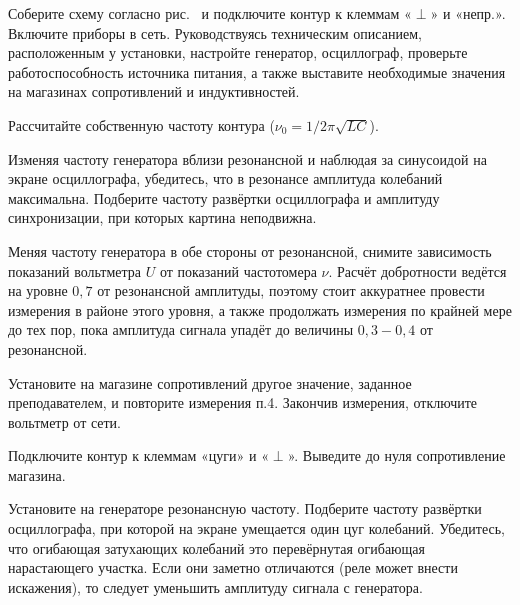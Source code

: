 \begin{lab:task}



	\item Соберите схему согласно рис.~
	и подключите контур к клеммам «$\perp$» и
«непр.». Включите приборы в сеть. Руководствуясь техническим описанием,
расположенным у установки, настройте генератор, осциллограф, проверьте
работоспособность источника питания, а также выставите необходимые
значения на магазинах сопротивлений и индуктивностей.


	\item Рассчитайте собственную частоту контура
($\nu_{0} = 1/2\pi\sqrt{LC}$).

	\item Изменяя частоту генератора вблизи резонансной и наблюдая за
синусоидой на экране осциллографа, убедитесь, что в резонансе амплитуда
колебаний максимальна. Подберите частоту развёртки осциллографа и
амплитуду синхронизации, при которых картина неподвижна.

	\item Меняя частоту генератора в обе стороны от резонансной, снимите
зависимость показаний вольтметра $U$ от показаний частотомера
$\nu$. Расчёт добротности ведётся на уровне $0,7$ от резонансной
амплитуды, поэтому стоит аккуратнее провести измерения в районе этого
уровня, а также продолжать измерения по крайней мере до тех пор, пока
амплитуда сигнала упадёт до величины $0,3 - 0,4$ от резонансной.

	\item Установите на магазине сопротивлений другое значение, заданное
преподавателем, и повторите измерения п.4. Закончив измерения, отключите
вольтметр от сети.


	\item Подключите контур к клеммам «цуги» и «$\perp$». Выведите до нуля
сопротивление магазина.

	\item Установите на генераторе резонансную частоту. Подберите частоту
развёртки осциллографа, при которой на экране умещается один цуг
колебаний. Убедитесь, что огибающая затухающих колебаний это
перевёрнутая огибающая нарастающего участка. Если они заметно отличаются
(реле может внести искажения), то следует уменьшить амплитуду сигнала с
генератора.


\end{lab:task}
